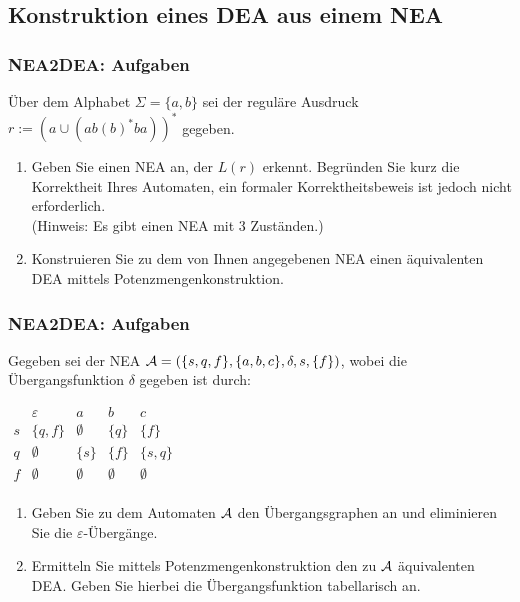 \documentclass{beamer}
\begin{document}
\subsection{Konstruktion eines DEA aus einem NEA}
\begin{frame}
  \frametitle{NEA2DEA: Aufgaben}
  Über dem Alphabet $\Sigma = \{a,b\}$ sei der reguläre
  Ausdruck
  $r := {(a \cup (ab (b)^* ba))^*}$
  gegeben.
  \begin{enumerate}
    \setlength{\itemsep}{0ex}
  \item Geben Sie einen NEA an, der $L(r)$ erkennt. Begründen Sie
    kurz die Korrektheit Ihres Automaten, ein formaler
    Korrektheitsbeweis ist jedoch nicht erforderlich.\\
    (Hinweis: Es gibt einen NEA mit 3 Zuständen.)
  \item Konstruieren Sie zu dem von Ihnen angegebenen NEA einen
    äquivalenten DEA mittels Potenzmengenkonstruktion.
  \end{enumerate}
\end{frame}

\begin{frame}
	\frametitle{NEA2DEA: Aufgaben}
Gegeben sei der NEA ${\cal A}=(\{s,q,f\},\{a,b,c\},\delta,s,\{f\})$, wobei
die Übergangsfunktion $\delta$ gegeben ist durch:
\begin{center}
$\begin{array}{r|cccc}
&\varepsilon & a & b & c\\\hline
s & \{q,f\} & \emptyset & \{q\} &\{f\}\\
q &  \emptyset & \{s\} & \{f\} & \{s,q\}\\
f & \emptyset & \emptyset &  \emptyset &  \emptyset\\
\end{array}$
\end{center}
\begin{enumerate}
\item Geben Sie zu dem Automaten ${\cal A}$ den Übergangsgraphen an und eliminieren
Sie die $\varepsilon$-Übergänge.
\item Ermitteln Sie mittels Potenzmengenkonstruktion den zu ${\cal A}$ äquivalenten
DEA. Geben Sie hierbei die Übergangsfunktion tabellarisch an.
\end{enumerate}
\end{frame}
\end{document}
